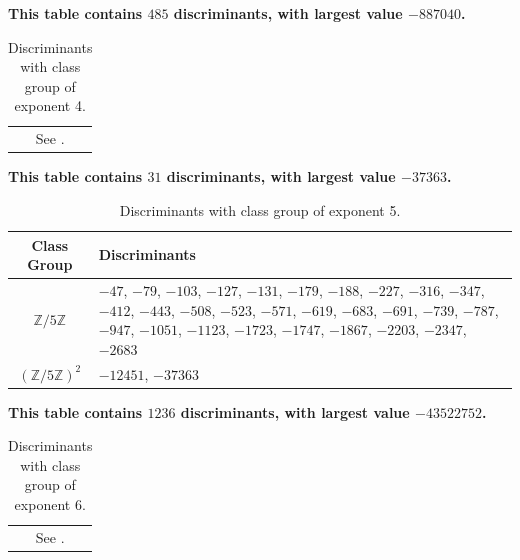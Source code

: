\documentclass[11pt,letterpaper,reqno]{amsart}
\numberwithin{equation}{section}
\numberwithin{figure}{section}
\numberwithin{table}{section}
\newcommand{\ZZ}{\mathbb{Z}}
\begin{document}
\begin{table}[H]
\caption{Discriminants with class group of exponent 4.}
\begin{center}
\textbf{This table contains $485$ discriminants, with largest value $-887040$. \\ \vspace{2mm}}
\begin{tabular}{  c }
    \label{table:CMexp4}
    See \cite[Table 4]{ross-code}. 
\end{tabular}
\end{center}
\end{table}


\begin{table}[H]
\caption{Discriminants with class group of exponent 5.}
\begin{center}
\textbf{This table contains $31$ discriminants, with largest value $-37363$. \\ \vspace{2mm}}
\begin{tabular}{ c | p{125mm} } 
    \label{table:CMexp5}
    Class Group & Discriminants \\ 
    \hline
    $\ZZ/5\ZZ$ & $-47$, $-79$, $-103$, $-127$, $-131$, $-179$, $-188$, $-227$, $-316$, $-347$, $-412$, $-443$, $-508$, $-523$, $-571$, $-619$, $-683$, $-691$, $-739$, $-787$, $-947$, $-1051$, $-1123$, $-1723$, $-1747$, $-1867$, $-2203$, $-2347$, $-2683$ \\
    \hline
    $(\ZZ/5\ZZ)^{2}$ & $-12451$, $-37363$ \\
    \hline
\end{tabular}
\end{center}
\end{table}


\begin{table}[H]
\caption{Discriminants with class group of exponent 6.}
\begin{center}
\textbf{This table contains $1236$ discriminants, with largest value $-43522752$. \\ \vspace{2mm}}
\begin{tabular}{  c }
    \label{table:CMexp6}
    See \cite[Table 6]{ross-code}. 
\end{tabular}
\end{center}
\end{table}
\end{document}
